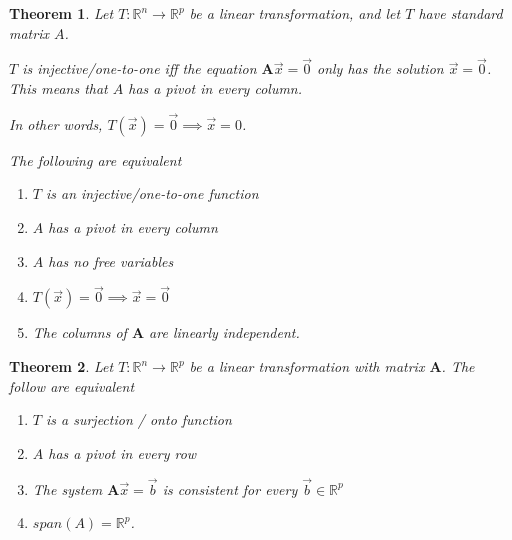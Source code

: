 \documentclass[11pt]{article}
\newtheorem{thm}{Theorem}
\begin{document}
\begin{thm}
  Let $T : \mathbb{R}^{n} \to \mathbb{R}^{p}$ be a linear transformation, and let $T$ have standard matrix $A$.

  $T$ is injective/one-to-one iff
  the equation $\textbf{A}\vec{x} = \vec{0}$ only has the solution $\vec{x} = \vec{0}$.
  This means that $A$ has a pivot in every column.


  In other words, $T(\vec{x}) = \vec{0} \implies \vec{x} = 0$.

  The following are equivalent
  \begin{enumerate}
    \item $T$ is an injective/one-to-one function
    \item $A$ has a pivot in every column
    \item $A$ has no free variables
    \item $T(\vec{x}) = \vec{0} \implies \vec{x} = \vec{0}$
    \item The columns of $\mathbf{A}$ are linearly independent.
  \end{enumerate}
\end{thm}


\begin{thm}
  Let $T : \mathbb{R}^{n} \to \mathbb{R}^{p}$ be a linear transformation with matrix $\mathbf{A}$. The follow are equivalent

  \begin{enumerate}
    \item $T$ is a surjection / onto function
    \item $A$ has a pivot in every row
    \item The system $\mathbf{A} \vec{x} = \vec{b}$ is consistent for every $\vec{b} \in \mathbb{R}^{p}$
    \item $span(A) = \mathbb{R}^{p}$.
  \end{enumerate}
\end{thm}
\end{document}
